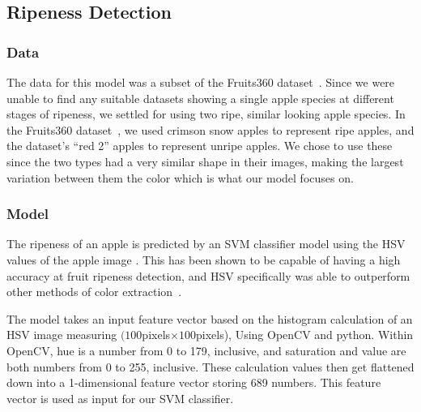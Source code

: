 \subsection{Ripeness Detection}
\subsubsection{Data}
The data for this model was a subset of the Fruits360 dataset~\cite{Fruit360}.
Since we were unable to find any suitable datasets showing a single apple species at different stages of ripeness, we settled for using two ripe, similar looking apple species.
In the Fruits360 dataset~\cite{Fruit360}, we used crimson snow apples to represent ripe apples, and the dataset's ``red 2'' apples to represent unripe apples. We  chose to use these since the two types had a very similar shape in their images, making the largest variation between them the color which is what our model focuses on.

\subsubsection{Model}
The ripeness of an apple is predicted by an SVM classifier model using the HSV values of the apple image . This has been shown to be capable of having a high accuracy at fruit ripeness detection, and HSV specifically was able to outperform other methods of color extraction~\cite{HSVRipeness}.

The model takes an input feature vector based on the histogram calculation of an HSV image measuring $(100$pixels$\times100$pixels), Using OpenCV and python.
Within OpenCV, hue is a number from 0 to 179, inclusive, and saturation and value are both numbers from 0 to 255, inclusive.
These calculation values then get flattened down into a 1-dimensional feature vector storing 689 numbers. 
This feature vector is used as input for our SVM classifier.

